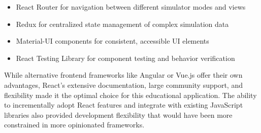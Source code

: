 \begin{itemize}
    \item React Router for navigation between different simulator modes and views
    \item Redux for centralized state management of complex simulation data
    \item Material-UI components for consistent, accessible UI elements
    \item React Testing Library for component testing and behavior verification
\end{itemize}

While alternative frontend frameworks like Angular or Vue.js offer their own advantages, React's extensive documentation, large community support, and flexibility made it the optimal choice for this educational application. The ability to incrementally adopt React features and integrate with existing JavaScript libraries also provided development flexibility that would have been more constrained in more opinionated frameworks.